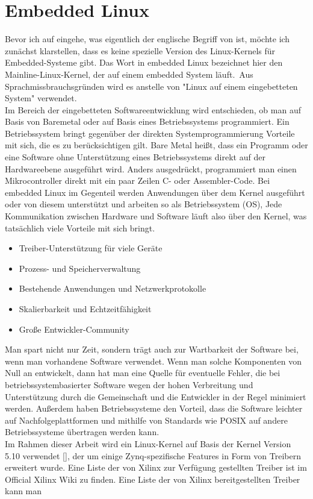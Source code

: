 \section{Embedded Linux}
\label{cha:ver:sec:Embedded_Linux}

Bevor ich auf  eingehe, was eigentlich der englische Begriff von  ist, möchte ich zunächst klarstellen, dass es keine spezielle Version des Linux-Kernels für Embedded-Systeme gibt. Das Wort  in embedded Linux bezeichnet hier den Mainline-Linux-Kernel, der auf einem embedded System läuft. Aus Sprachmissbrauchsgründen wird es anstelle von "Linux auf einem eingebetteten System" verwendet.\\
Im Bereich der eingebetteten Softwareentwicklung wird entschieden, ob man auf Basis von Baremetal oder auf Basis eines Betriebssystems programmiert. Ein Betriebssystem bringt gegenüber der direkten Systemprogrammierung Vorteile mit sich, die es zu berücksichtigen gilt. Bare Metal heißt, dass ein Programm oder eine Software ohne Unterstützung eines Betriebssystems direkt auf der Hardwareebene ausgeführt wird. Anders ausgedrückt, programmiert man einen Mikrocontroller direkt mit ein paar Zeilen C- oder Assembler-Code. Bei embedded Linux im Gegenteil werden Anwendungen über dem Kernel ausgeführt oder von diesem unterstützt und arbeiten so als Betriebssystem (OS), Jede Kommunikation zwischen Hardware und Software läuft also über den Kernel, was tatsächlich viele Vorteile mit sich bringt.

\begin{itemize}
	\item Treiber-Unterstützung für viele Geräte
	\item Prozess- und Speicherverwaltung
	\item Bestehende Anwendungen und Netzwerkprotokolle
	\item Skalierbarkeit und Echtzeitfähigkeit 
	\item Große Entwickler-Community
\end{itemize}

Man spart nicht nur Zeit, sondern trägt auch zur Wartbarkeit der Software bei, wenn man vorhandene Software verwendet. Wenn man solche Komponenten von Null an entwickelt, dann hat man eine Quelle für eventuelle Fehler, die bei betriebssystembasierter Software wegen der hohen Verbreitung und Unterstützung durch die Gemeinschaft und die Entwickler in der Regel minimiert werden. Außerdem haben Betriebssysteme den Vorteil, dass die Software leichter auf Nachfolgeplattformen und mithilfe von Standards wie POSIX auf andere Betriebssysteme übertragen werden kann.\\
Im Rahmen dieser Arbeit wird ein Linux-Kernel auf Basis der Kernel Version 5.10 verwendet [\cite{kernel}], der um einige Zynq-spezifische Features in Form von Treibern erweitert wurde. Eine Liste der von Xilinx zur Verfügung gestellten Treiber ist im Official Xilinx Wiki zu finden.
Eine Liste der von Xilinx bereitgestellten Treiber kann man 

